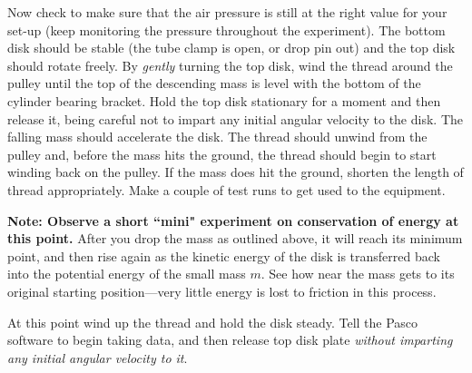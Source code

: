 Now check to make sure that the air pressure is still at the right value for
your set-up (keep
monitoring the pressure throughout the experiment).  The bottom disk should be
stable (the tube clamp is open, or drop pin out) and the top disk should rotate freely.  By
{\em gently} turning the top disk, wind the thread around the pulley until the
top of the descending mass is level with the bottom of the cylinder
bearing
bracket.  Hold the top disk stationary for a moment and then release it, being
careful not to impart any initial angular velocity to the disk.  The falling
mass should accelerate the disk.  The thread should unwind from the pulley
and, before the mass hits the ground, the thread should begin to start winding
back on the pulley.  If the mass does hit the ground, shorten the length of
thread appropriately.  Make a couple of test runs to get used
to the equipment.  %

{\bf Note:  Observe a short ``mini" experiment on conservation of
energy at this point.}  After you drop the mass as outlined above, it
will reach its minimum point, and then rise again as the kinetic
energy of the disk is transferred back into the potential energy of
the small mass $m$.  See how near the mass gets to its original
starting position---very little energy is lost to friction in
this process.


At this point wind up the thread and hold the disk steady.
Tell the Pasco
software to begin taking data, and then release top disk
plate {\em without imparting any initial angular velocity to it}.

